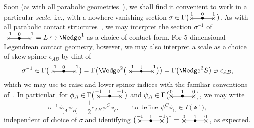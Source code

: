 \documentclass[pdftex]{sigma}%
\numberwithin{equation}{section}
\newcommand{\xox}[3]{\begin{picture}(40,11)
\put(4,1.5){\makebox(0,0){$\times$}}
\put(20,1.5){\makebox(0,0){$\bullet$}}
\put(36,1.5){\makebox(0,0){$\times$}}
\put(4,1.5){\line(1,0){32}}
\put(4,8){\makebox(0,0){$\scriptstyle #1$}}
\put(20,8){\makebox(0,0){$\scriptstyle #2$}}
\put(36,8){\makebox(0,0){$\scriptstyle #3$}}
\end{picture}}
\begin{document}
Soon (as with all parabolic geometries~\cite{CSweyl}), we shall find it
convenient to work in a particular {\em scale}, i.e., with a nowhere vanishing
section $\sigma\in\Gamma\big(\xox{1}{0}{1}\big)$. As with all parabolic contact
structures~\cite[Section~4.2]{CS}, we may interpret the section $\sigma^{-1}$ of
$\,\xox{-1}{0}{-1}\,=L\hookrightarrow\Wedge^1$ as a choice of contact form.
For $5$-dimensional Legendrean contact geometry, however, we may also interpret
a scale as a choice of skew spinor $\epsilon_{AB}$ by dint of
\begin{equation}\label{epsilon}\sigma^{-1}\in\Gamma\big(\,\xox{-1}{0}{-1}\,\big)
=\Gamma\big(\Wedge^2\big(\,\xox{-1}{1}{-1}\,\big)\big)=\Gamma\big(\Wedge^2S\big)
\ni\epsilon_{AB},\end{equation} which we may use to raise and lower spinor
indices with the familiar conventions of~\cite{OT}. In particular, for
$\phi_A\in\Gamma\big(\,\xox{-1}{1}{-1}\,\big)$ and $\psi_A\in\Gamma\big(\xox{0}{1}{0}\big)$, we
may write
\[\textstyle\sigma^{-1}\phi_{[A}\psi_{B]}=\frac12\epsilon_{AB}\psi^C\phi_C
\qquad\mbox{to define }\psi^C\phi_C\in\Gamma\big(\Wedge^0\big),\]
independent of choice of $\sigma$ and identifying
$\big(\,\xox{-1}{1}{-1}\,\big)^*=\xox{0}{1}{0}$, as expected.
\end{document}
